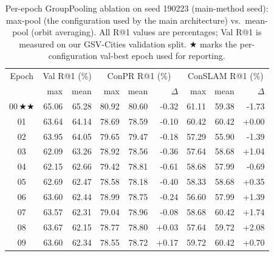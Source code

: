 \begin{table}[h]
\centering
\small
\setlength{\tabcolsep}{4pt}
\caption{Per-epoch GroupPooling ablation on seed 190223 (main-method seed): max-pool (the configuration used by the main architecture) vs.\ mean-pool (orbit averaging). All R@1 values are percentages; Val R@1 is measured on our GSV-Cities validation split. $\bigstar$ marks the per-configuration val-best epoch used for reporting.}
\label{tab:supp_s2_grouppool}
\begin{tabular}{c|rr|rrr|rrr}
\toprule
Epoch & \multicolumn{2}{c|}{Val R@1 (\%)} & \multicolumn{3}{c|}{ConPR R@1 (\%)} & \multicolumn{3}{c}{ConSLAM R@1 (\%)} \\
 & max & mean & max & mean & $\Delta$ & max & mean & $\Delta$ \\
\midrule
00\,$\bigstar\bigstar$ & 65.06 & 65.28 & 80.92 & 80.60 & -0.32 & 61.11 & 59.38 & -1.73 \\
01 & 63.64 & 64.14 & 78.69 & 78.59 & -0.10 & 60.42 & 60.42 & +0.00 \\
02 & 63.95 & 64.05 & 79.65 & 79.47 & -0.18 & 57.29 & 55.90 & -1.39 \\
03 & 62.09 & 63.26 & 78.92 & 78.56 & -0.36 & 57.64 & 58.68 & +1.04 \\
04 & 62.15 & 62.66 & 79.42 & 78.81 & -0.61 & 58.68 & 57.99 & -0.69 \\
05 & 62.69 & 62.47 & 78.58 & 78.18 & -0.40 & 58.33 & 58.68 & +0.35 \\
06 & 63.60 & 62.44 & 78.99 & 78.75 & -0.24 & 56.60 & 57.99 & +1.39 \\
07 & 63.57 & 62.31 & 79.04 & 78.96 & -0.08 & 58.68 & 60.42 & +1.74 \\
08 & 63.67 & 62.15 & 78.77 & 78.80 & +0.03 & 57.64 & 59.72 & +2.08 \\
09 & 63.60 & 62.34 & 78.55 & 78.72 & +0.17 & 59.72 & 60.42 & +0.70 \\
\bottomrule
\end{tabular}
\end{table}
